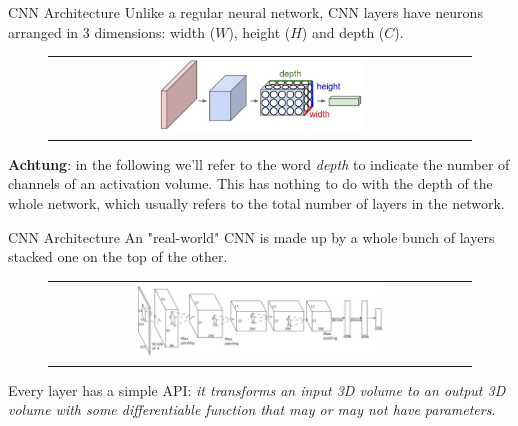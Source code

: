 \documentclass[aspectratio=169]{beamer}
\begin{document}
\begin{frame}{CNN Architecture}
Unlike a regular neural network, CNN layers have neurons arranged in 3 dimensions: width ($W$), height ($H$) and depth ($C$).
\begin{figure}
\begin{tabular}{c}
\includegraphics[width=0.5\textwidth]{img/cnn/cnn_vs_dnn.jpg}
\end{tabular}
\end{figure}

\textbf{Achtung}: in the following we'll refer to the word \emph{depth} to indicate the number of channels of an activation volume. This has nothing to do with the depth of the whole network, which usually refers to the total number of layers in the network.
\end{frame}


\begin{frame}{CNN Architecture}
An "real-world" CNN is made up by a whole bunch of layers stacked one on the top of the other.
\begin{figure}
\begin{tabular}{c}
\includegraphics[width=0.6\textwidth]{img/cnn/cnn_architecture.jpg}
\end{tabular}
\end{figure}
\large{Every layer has a simple API: \emph{it transforms an input 3D volume to an output 3D volume with some differentiable function that may or may not have parameters}}.
\end{frame}

\end{document}
